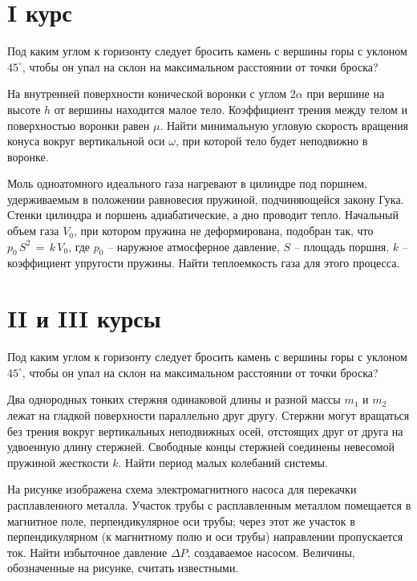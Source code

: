 \section{I курс}

\AddProb Под каким углом к горизонту следует бросить камень с вершины горы с уклоном $ 45^{\circ}$, 
чтобы он упал на склон на максимальном расстоянии от точки броска?

\AddProb На внутренней поверхности конической воронки с углом $2\alpha$ при вершине на высоте $h$ от вершины находится малое тело. 
Коэффициент трения между телом и поверхностью воронки равен $\mu$. 
Найти минимальную угловую скорость вращения конуса вокруг вертикальной оси $\omega$, при которой тело будет неподвижно в воронке.

\AddProb Моль одноатомного идеального газа нагревают в цилиндре под поршнем, удерживаемым в положении равновесия пружиной, подчиняющейся закону Гука. 
Стенки цилиндра и поршень адиабатические, а дно проводит тепло. Начальный объем газа $V_0$, при котором пружина не деформирована, подобран так, 
что $p_0\,S^2\,=\,k\,V_0$, где $p_0$ -- наружное атмосферное давление, $S$ -- площадь поршня, $k$ -- коэффициент упругости пружины. 
Найти теплоемкость газа для этого процесса.


\section{II и III курсы}

\AddProb Под каким углом к горизонту следует бросить камень с вершины горы с уклоном $ 45^{\circ}$, 
чтобы он упал на склон на максимальном расстоянии от точки броска?

\AddProb Два однородных тонких стержня одинаковой длины и разной массы $m_1$ и $m_2$ лежат на гладкой поверхности параллельно друг другу. 
Стержни могут вращаться без трения вокруг вертикальных неподвижных осей, отстоящих друг от друга на удвоенную длину стержней. 
Свободные концы стержней соединены невесомой пружиной жесткости $k$. Найти период малых колебаний системы.

\AddProb На рисунке изображена схема электромагнитного насоса для перекачки расплавленного металла. 
Участок трубы с расплавленным металлом помещается в магнитное поле, перпендикулярное оси трубы; 
через этот же участок в перпендикулярном (к магнитному полю и оси трубы) направлении пропускается ток. 
Найти избыточное давление $\Delta P$, создаваемое насосом. Величины, обозначенные на рисунке, считать известными.